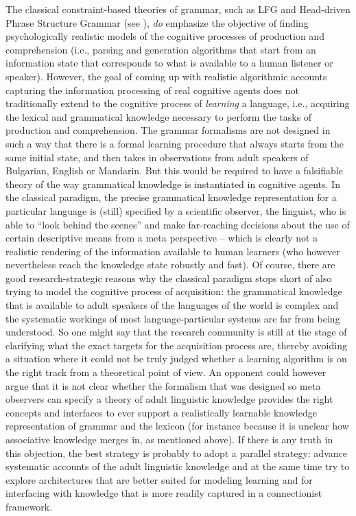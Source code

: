 \documentclass[output=paper,hidelinks]{langscibook}
\begin{document}
 
The classical constraint-based theories of grammar, such as LFG and Head-driven Phrase Structure Grammar (see ), %
\emph{do} emphasize the objective of finding psychologically realistic models of the cognitive processes of production and comprehension (i.e., parsing and generation algorithms that start from an information state that corresponds to what is available to a human listener or speaker).
However, the goal of coming up with realistic algorithmic accounts capturing the information processing of real cognitive agents does not traditionally extend to the cognitive process of \emph{learning} a language, i.e., acquiring the lexical and grammatical knowledge necessary to perform the tasks of production and comprehension.
The grammar formalisms are not designed in such a way that there is a formal learning procedure that always starts from the same initial state, and then takes in observations from adult speakers of Bulgarian, English or Mandarin. But this would be required to have a falsifiable theory of the way grammatical knowledge is instantiated in cognitive agents.
In the classical paradigm, the precise grammatical knowledge representation for a particular language is (still) specified by a scientific observer, the linguist, who is able to ``look behind the scenes'' and make far-reaching decisions about the use of certain descriptive means from a meta perspective -- which is clearly not a realistic rendering of the information available to human learners (who however nevertheless reach the knowledge state robustly and fast).
Of course, there are good research-strategic reasons why the classical paradigm stops short of also trying to model the cognitive process of acquisition: the grammatical knowledge that is available to adult speakers of the languages of the world is complex and the systematic workings of most language-particular systems are far from being understood. So one might say that the research community is still at the stage of clarifying what the exact targets for the acquisition process are, thereby avoiding a situation where it could not be truly judged whether a learning algorithm is on the right track from a theoretical point of view.
An opponent could however argue that it is not clear whether the formalism that was designed so meta observers can specify a theory of adult linguistic knowledge provides the right concepts and interfaces to ever support a realistically learnable knowledge representation of grammar and the lexicon (for instance because it is unclear how associative knowledge merges in, as mentioned above). If there is any truth in this objection, the best strategy is probably to adopt a parallel strategy: advance systematic accounts of the adult linguistic knowledge and at the same time try to explore architectures that are better suited for modeling learning and for interfacing with knowledge that is more readily captured in a connectionist framework.
\end{document}
